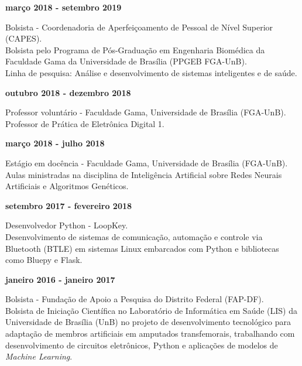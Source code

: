 \documentclass[11pt]{article}
\begin{document}
\textbf{março 2018 - setembro 2019}
\begin{addmargin}{0.5cm}
Bolsista - Coordenadoria de Aperfeiçoamento de Pessoal de Nível Superior (CAPES). \\
Bolsista pelo Programa de Pós-Graduação em Engenharia Biomédica
da Faculdade Gama da Universidade de Brasília (PPGEB FGA-UnB).\\
Linha de pesquisa: Análise e desenvolvimento de sistemas inteligentes e de saúde.\\
\end{addmargin}

\textbf{outubro 2018 - dezembro 2018}
\begin{addmargin}{0.5cm}
Professor voluntário - Faculdade Gama, Universidade de Brasília (FGA-UnB).\\
Professor de Prática de Eletrônica Digital 1. \\
\end{addmargin}

\textbf{março 2018 - julho 2018}
\begin{addmargin}{0.5cm}
Estágio em docência - Faculdade Gama, Universidade de Brasília (FGA-UnB).\\
Aulas ministradas na disciplina de Inteligência Artificial sobre Redes 
Neurais Artificiais e Algoritmos Genéticos. \\
\end{addmargin}

\textbf{setembro 2017 - fevereiro 2018}
\begin{addmargin}{0.5cm}
Desenvolvedor Python - LoopKey.\\
Desenvolvimento de sistemas de comunicação, automação e controle via Bluetooth
(BTLE) em sistemas Linux embarcados com Python e bibliotecas como
Bluepy e Flask. \\
\end{addmargin}

\textbf{janeiro 2016 - janeiro 2017}
\begin{addmargin}{0.5cm}
Bolsista - Fundação de Apoio a Pesquisa do Distrito Federal (FAP-DF).\\
Bolsista de Iniciação Científica no Laboratório de Informática em Saúde (LIS)  da Universidade de
Brasília (UnB) no projeto
de desenvolvimento tecnológico para adaptação de membros artificiais em amputados transfemorais,
trabalhando com desenvolvimento de circuitos eletrônicos, Python e aplicações de modelos de 
\textit{Machine Learning}.\\

\end{addmargin}
\end{document}
